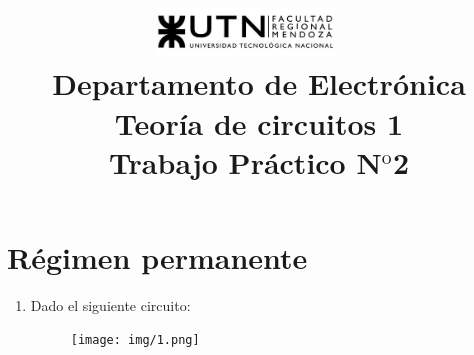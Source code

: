 \documentclass[10pt,a4paper]{article}
\title{
	\textsc{\includegraphics[width=0.35\textwidth]{logoUTN.jpg}} ~\\
	{\large Departamento de Electr\'onica}\\ 
	[0.1cm]
	{\Huge{Teoría de circuitos 1}} \\
	[0.25cm]
	{\Large{Trabajo Práctico N$^{\text {o}}$2}		\\
}}
\author{}
\date{}
\begin{document}
	\maketitle
	
\section{Régimen permanente}
\begin{enumerate}
	

\item Dado el siguiente circuito:

\begin{figure}[H]
	\centering
	\texttt{[image: img/1.png]}
	\label{e1}
\end{figure}


























\end{enumerate}
\end{document}
